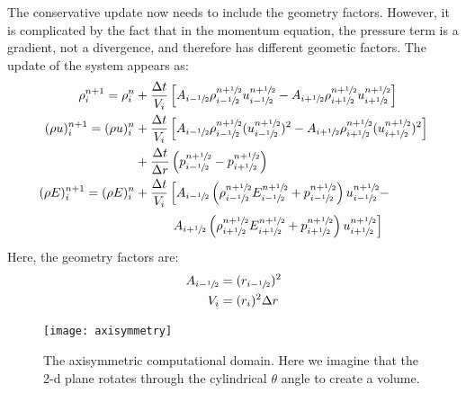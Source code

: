 The conservative update now needs to include the geometry factors.  However,
it is complicated by the fact that in the momentum equation, the pressure 
term is a gradient, not a divergence, and therefore has different 
geometic factors.  The update of the system appears as:
\begin{align}
\rho^{n+1}_i = \rho^n_i &+ \frac{\Delta t}{V_i} 
   \left [A_{i-\myhalf} \rho_{i-\myhalf}^{n+\myhalf} u_{i-\myhalf}^{n+\myhalf} - 
          A_{i+\myhalf} \rho_{i+\myhalf}^{n+\myhalf} u_{i+\myhalf}^{n+\myhalf} \right ] \\
(\rho u)^{n+1}_i = (\rho u)^n_i &+ \frac{\Delta t}{V_i} 
   \left [ A_{i-\myhalf} \rho_{i-\myhalf}^{n+\myhalf} (u_{i-\myhalf}^{n+\myhalf})^2  - 
           A_{i+\myhalf} \rho_{i+\myhalf}^{n+\myhalf} (u_{i+\myhalf}^{n+\myhalf})^2  \right ]\nonumber \\
        & + \frac{\Delta t}{\Delta r} \left ( p_{i-\myhalf}^{n+\myhalf} - 
                                              p_{i+\myhalf}^{n+\myhalf} \right ) \\
(\rho E)^{n+1}_i = (\rho E)^n_i &+ \frac{\Delta t}{V_i} 
   \left [ A_{i-\myhalf} \left (\rho_{i-\myhalf}^{n+\myhalf} E_{i-\myhalf}^{n+\myhalf}  + p_{i-\myhalf}^{n+\myhalf} \right ) u_{i-\myhalf}^{n+\myhalf} - \right . \nonumber \\
   &\phantom{+ \frac{\Delta t}{V_i} \left[ \right.}   \left .   A_{i+\myhalf} \left (\rho_{i+\myhalf}^{n+\myhalf} E_{i+\myhalf}^{n+\myhalf}  + p_{i+\myhalf}^{n+\myhalf} \right ) u_{i+\myhalf}^{n+\myhalf} \right ]
\end{align}
Here, the geometry factors are:
\begin{align}
A_{i-{\sfrac{1}{2}}} &= (r_{i-{\sfrac{1}{2}}})^2\\
V_i &= (r_i)^2 \Delta r
\end{align}

\begin{figure}
\centering
\texttt{[image: axisymmetry]}
\caption[The axisymmetric computational domain]
{\label{fig:axisymmetri} The axisymmetric computational domain.  Here we
  imagine that the 2-d plane rotates through the cylindrical $\theta$ angle to
  create a volume.}
\end{figure}

